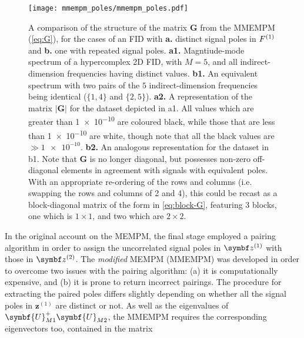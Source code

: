 \begin{figure}
    \centering
    \texttt{[image: mmempm\_poles/mmempm\_poles.pdf]}
    \caption[
        A comparison of the structure of the matrix $\symbf{G}$ from the
        \acs{MMEMPM}, for the cases of an \acs{FID} with distinct signal poles
        in $\Fone$ and one with repeated signal poles
    ]{
        A comparison of the structure of the matrix $\symbf{G}$ from the
        \acs{MMEMPM} (\cref{eq:G}), for the cases of an \acs{FID} with \textbf{a.} distinct
        signal poles in $\Fone$ and \textbf{b.} one with repeated signal poles.
        \textbf{a1.} Magntiude-mode spectrum of a hypercomplex \ac{2D}
        \ac{FID}, with $M=5$, and all indirect-dimension frequencies having
        distinct values.
        \textbf{b1.} An equivalent spectrum with two pairs of the $5$
        indirect-dimension frequencies being identical ($\lbrace 1, 4 \rbrace$
        and  $\lbrace 2, 5 \rbrace$).
        \textbf{a2.} A representation of the matrix
        $\lvert \symbf{G} \rvert$ for the dataset depicted in a1. All values
        which are greater than \num{1e-10} are coloured black, while those that
        are less than \num{1e-10} are white, though note that all the black
        values are $\gg \num{1e-10}$.
        \textbf{b2.} An analogous representation for the dataset in b1. Note
        that $\symbf{G}$ is no longer diagonal, but possesses non-zero
        off-diagonal elements in agreement with signals with equivalent poles.
        With an appropriate re-ordering of the rows and columns (i.e. swapping
        the rows and columns of 2 and 4), this could be recast as a
        block-diagonal matrix of the form in \cref{eq:block-G}, featuring 3
        blocks, one which is $1 \times 1$, and two which are  $2 \times 2$.
    }
    \label{fig:mmempm-poles}
\end{figure}
In the original account on the \ac{MEMPM}, the final stage employed a
pairing algorithm in order to assign the uncorrelated signal poles in $\bdzone$
with those in $\bdztwo$\cite{Hua1992}. The \emph{modified} \ac{MEMPM} (\acs{MMEMPM}) was
developed in order to overcome two issues with the pairing algorithm: (a) it is
computationally expensive, and (b) it is prone to return incorrect
pairings\cite{Chen2007}.
The procedure for extracting the paired poles differs slightly depending on
whether all the signal poles in $\symbf{z}^{(1)}$ are distinct or not.
As well as the eigenvalues of
$\symbf{U}^{+}_{M1}\symbf{U}_{M2}^{\vphantom{+}}$, the \ac{MMEMPM} requires
the corresponding eigenvectors too, contained in the matrix
